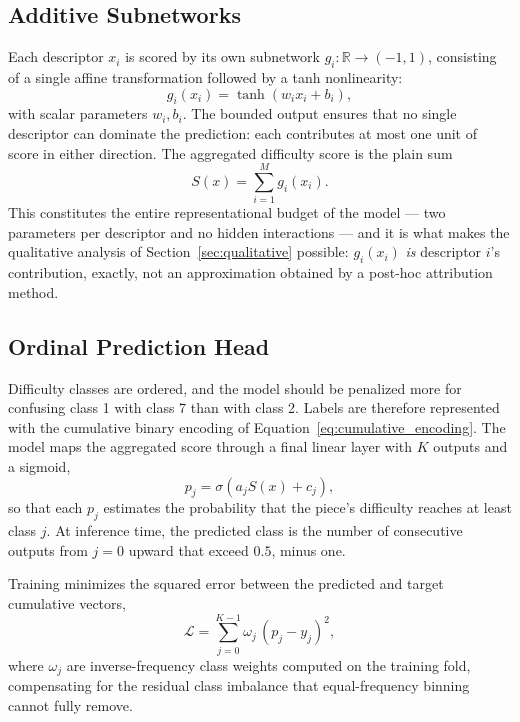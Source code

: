 \subsection{Additive Subnetworks}
Each descriptor $x_i$ is scored by its own subnetwork $g_i:\mathbb{R} \to (-1, 1)$, consisting of a single affine transformation followed by a tanh nonlinearity:
\begin{equation}
    g_i(x_i) = \tanh(w_i x_i + b_i),
\end{equation}
with scalar parameters $w_i, b_i$. The bounded output ensures that no single descriptor can dominate the prediction: each contributes at most one unit of score in either direction. The aggregated difficulty score is the plain sum
\begin{equation}
    S(x) = \sum_{i=1}^{M} g_i(x_i).
\end{equation}
This constitutes the entire representational budget of the model --- two parameters per descriptor and no hidden interactions --- and it is what makes the qualitative analysis of Section~\ref{sec:qualitative} possible: $g_i(x_i)$ \emph{is} descriptor $i$'s contribution, exactly, not an approximation obtained by a post-hoc attribution method.

\subsection{Ordinal Prediction Head}
Difficulty classes are ordered, and the model should be penalized more for confusing class 1 with class 7 than with class 2. Labels are therefore represented with the cumulative binary encoding of Equation~\ref{eq:cumulative_encoding}. The model maps the aggregated score through a final linear layer with $K$ outputs and a sigmoid,
\begin{equation}
    p_j = \sigma(a_j S(x) + c_j),
\end{equation}
so that each $p_j$ estimates the probability that the piece's difficulty reaches at least class $j$. At inference time, the predicted class is the number of consecutive outputs from $j=0$ upward that exceed $0.5$, minus one.

Training minimizes the squared error between the predicted and target cumulative vectors,
\begin{equation}
    \mathcal{L} = \sum_{j=0}^{K-1} \omega_j \, (p_j - y_j)^2,
\end{equation}
where $\omega_j$ are inverse-frequency class weights computed on the training fold, compensating for the residual class imbalance that equal-frequency binning cannot fully remove.

